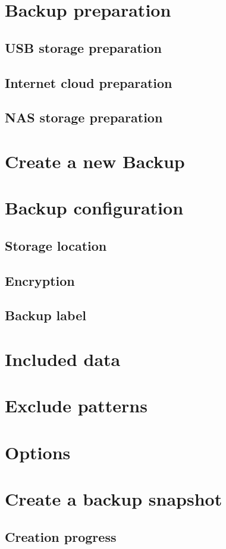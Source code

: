 \section{Backup preparation}
\subsection{USB storage preparation}
\subsection{Internet cloud preparation}
\subsection{NAS storage preparation}
\section{Create a new Backup}
\section{Backup configuration}
\subsection{Storage location}
\subsection{Encryption}
\subsection{Backup label}
\section{Included data}
\section{Exclude patterns}
\section{Options}
\section{Create a backup snapshot}
\subsection{Creation progress}
